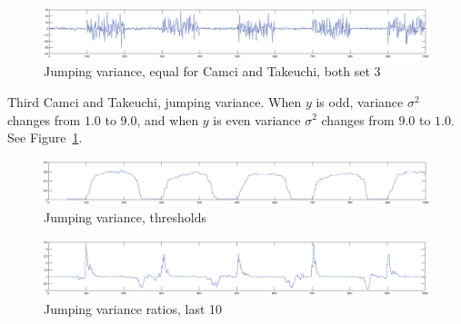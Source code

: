 \begin{figure}
\centering
  \includegraphics[width=1\textwidth]{./Figures/notes/jumping_variance.eps}
  \caption[Jumping variance]{Jumping variance, equal for Camci and Takeuchi, both set 3}
  \label{fig:jumping_variance_camci_takeuchi}
\end{figure}

Third Camci and Takeuchi, jumping variance.
When $y$ is odd, variance $\sigma^2$ changes from $1.0$ to $9.0$, and when $y$ is even variance $\sigma^2$ changes from $9.0$ to $1.0$.
See Figure~\ref{fig:jumping_variance_camci_takeuchi}.

\begin{figure}
\centering
  \includegraphics[width=1\textwidth]{./Figures/notes/jumping_variance_thresholds.eps}
  \caption[Jumping variance thresholds]{Jumping variance, thresholds}
\end{figure}

\begin{figure}
\centering
  \includegraphics[width=1\textwidth]{./Figures/notes/jumping_variance_ratios_10.eps}
  \caption[Jumping variance ratios]{Jumping variance ratios, last 10}
\end{figure}